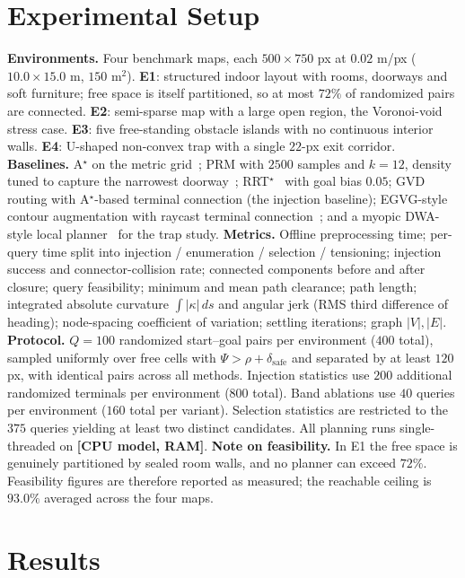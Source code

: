 \documentclass[conference]{IEEEtran}
\newcommand{\PH}[1]{{\color{red}\textbf{[#1]}}}
\begin{document}
\section{Experimental Setup}
\textbf{Environments.} Four benchmark maps, each $500\times750$ px at $0.02$ m/px ($10.0\times15.0$ m, $150$ m$^2$). \textbf{E1}: structured indoor layout with rooms, doorways and soft furniture; free space is itself partitioned, so at most $72\%$ of randomized pairs are connected. \textbf{E2}: semi-sparse map with a large open region, the Voronoi-void stress case. \textbf{E3}: five free-standing obstacle islands with no continuous interior walls. \textbf{E4}: U-shaped non-convex trap with a single $22$-px exit corridor.
\textbf{Baselines.} A$^\star$ on the metric grid~\cite{hart1968}; PRM with $2500$ samples and $k=12$, density tuned to capture the narrowest doorway~\cite{kavraki1996}; RRT$^\star$~\cite{karaman2011} with goal bias $0.05$; GVD routing with A$^\star$-based terminal connection (the injection baseline); EGVG-style contour augmentation with raycast terminal connection~\cite{qi2025egvg}; and a myopic DWA-style local planner~\cite{fox1997} for the trap study.
\textbf{Metrics.} Offline preprocessing time; per-query time split into injection / enumeration / selection / tensioning; injection success and connector-collision rate; connected components before and after closure; query feasibility; minimum and mean path clearance; path length; integrated absolute curvature $\int|\kappa|\,ds$ and angular jerk (RMS third difference of heading); node-spacing coefficient of variation; settling iterations; graph $|V|,|E|$.
\textbf{Protocol.} $Q=100$ randomized start--goal pairs per environment ($400$ total), sampled uniformly over free cells with $\Psi>\rho+\delta_{\mathrm{safe}}$ and separated by at least $120$ px, with identical pairs across all methods. Injection statistics use $200$ additional randomized terminals per environment ($800$ total). Band ablations use $40$ queries per environment ($160$ total per variant). Selection statistics are restricted to the $375$ queries yielding at least two distinct candidates. All planning runs single-threaded on \PH{CPU model, RAM}.
\textbf{Note on feasibility.} In E1 the free space is genuinely partitioned by sealed room walls, and no planner can exceed $72\%$. Feasibility figures are therefore reported as measured; the reachable ceiling is $93.0\%$ averaged across the four maps.
\section{Results}
\label{sec:results}
\end{document}
